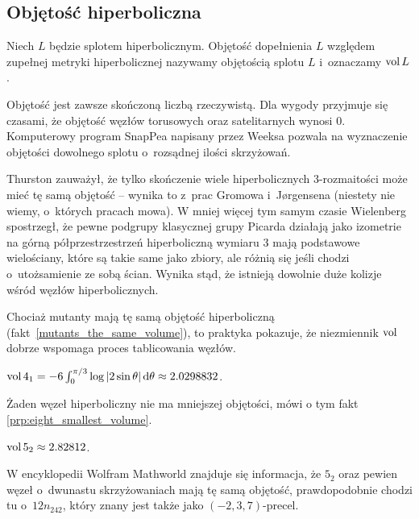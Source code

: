 
\subsection{Objętość hiperboliczna}

%
\begin{definition}[objętość]
    Niech $L$ będzie splotem hiperbolicznym.
    Objętość dopełnienia $L$ względem zupełnej metryki hiperbolicznej nazywamy objętością splotu $L$ i~oznaczamy $\operatorname{vol} L$.
\end{definition}

Objętość jest zawsze skończoną liczbą rzeczywistą.
Dla wygody przyjmuje się czasami, że objętość węzłów torusowych oraz satelitarnych wynosi $0$.
Komputerowy program SnapPea napisany przez Weeksa pozwala na wyznaczenie objętości dowolnego splotu o~rozsądnej ilości skrzyżowań.

Thurston \cite[s. 365]{thurston1982} zauważył, że tylko skończenie wiele hiperbolicznych 3-rozmaitości może mieć tę samą objętość -- wynika to z~prac Gromowa i~Jørgensena (niestety nie wiemy, o~których pracach mowa).
%
W mniej więcej tym samym czasie Wielenberg \cite{wielenberg1981} spostrzegł, że pewne podgrupy klasycznej grupy Picarda działają jako izometrie na górną półprzestrzestrzeń hiperboliczną wymiaru 3 mają podstawowe wielościany, które są takie same jako zbiory, ale różnią się jeśli chodzi o~utożsamienie ze sobą ścian.
%
%
Wynika stąd, że istnieją dowolnie duże kolizje wśród węzłów hiperbolicznych.

Chociaż mutanty mają tę samą objętość hiperboliczną (fakt~\ref{mutants_the_same_volume}), to praktyka pokazuje, że niezmiennik $\operatorname{vol}$ dobrze wspomaga proces tablicowania węzłów.
%

\begin{example}
    $\operatorname{vol} 4_1 = -6 \int_{0}^{\pi/3} \log |2\sin \theta| \,\mathrm{d}\theta \approx 2.0298832$.
\end{example}

Żaden węzeł hiperboliczny nie ma mniejszej objętości, mówi o tym fakt \ref{prp:eight_smallest_volume}.

\begin{example}
    $\operatorname{vol} 5_2 \approx 2.82812$.
\end{example}

W encyklopedii Wolfram Mathworld znajduje się informacja, że $5_2$ oraz pewien węzeł o~dwunastu skrzyżowaniach mają tę samą objętość, prawdopodobnie chodzi tu o~$12n_{242}$, który znany jest także jako $(-2, 3, 7)$-precel.
%
%

